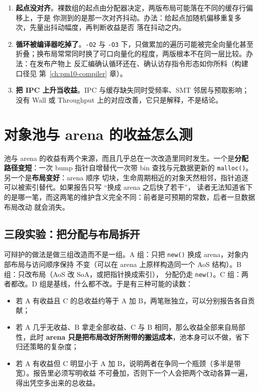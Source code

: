 \documentclass[12pt,a4paper,fontset=fandol]{ctexbook}
\newcommand{\Fn}[1]{\texttt{#1()}}
\newcommand{\Tp}[1]{\texttt{#1}}
\newcommand{\Lang}[1]{\textsf{#1}}
\newcommand{\MWall}{\Lang{Wall}}
\newcommand{\MThr}{\Lang{Throughput}}
\newcommand{\Mx}[1]{\textsf{#1}}
\begin{document}
\begin{warning}[title={局部性实验最常见的三个假信号}]
  \begin{enumerate}
    \item \textbf{起点没对齐}。裸数组的起点由分配器决定，两版布局可能落在不同的缓存行偏移上，于是
          你测到的是那一次对齐抖动。办法：给起点加随机偏移重复多次，先量出抖动幅度，再判断收益是否
          落在抖动之内。
    \item \textbf{循环被编译器吃掉了}。\Tp{-O2} 与 \Tp{-O3} 下，只做累加的遍历可能被完全向量化甚至
          折叠；换布局常常同时换了可口向量化的程度，两版根本不在同一层比较。办法：在发布产物上
          反汇编确认循环还在、确认访存指令形态如你所料（构建口径见 第~\ref{ch:pm10-compiler} 章）。
    \item \textbf{把 \Mx{IPC} 上升当收益}。\Mx{IPC} 与缓存缺失同时受频率、SMT 邻居与预取影响；没有
          \MWall{} 或 \MThr{} 上的对应改善，它只是解释，不是结论。
  \end{enumerate}
\end{warning}

\section{对象池与 arena 的收益怎么测}
\label{sec:pm07-pool}

池与 arena 的收益有两个来源，而且几乎总在一次改造里同时发生。一个是\textbf{分配路径变短}：一次
bump 指针自增替代一次带 bin 查找与元数据更新的 \Fn{malloc}。另一个是\textbf{布局变好}：arena 顺序
切块，生命周期相近的对象天然相邻，指针追逐可以被索引替代。如果报告只写 ``换成 arena 之后快了若干''，
读者无法知道省下的是哪一笔，而这两笔的维护含义完全不同：前者是可预期的常数，后者一旦数据布局改动
就会消失。

\subsection{三段实验：把分配与布局拆开}
\label{sub:pm07-threeway}

可辩护的做法是做三组改造而不是一组。A 组：只把 \Fn{new} 换成 arena，对象内部布局与访问顺序保持
不变（可以在 arena 上原样构造同一个 AoS 结构）。B 组：只改布局（AoS 改 SoA，或把指针换成索引），
分配仍走 \Fn{new}。C 组：两者都改。D 组是基线，什么都不改。于是有三种可能的读数：

\begin{itemize}
  \item 若 A 有收益且 C 的总收益约等于 A 加 B，两笔账独立，可以分别报告各自贡献；
  \item 若 A 几乎无收益、B 拿走全部收益、C 与 B 相同，那么收益全部来自局部性，此时
        \textbf{arena 只是把布局改好所附带的搬运成本}，池本身可以不做，省下归还策略的复杂度；
  \item 若 A 有收益但 C 明显小于 A 加 B，说明两者在争同一个瓶颈（多半是带宽）。报告里必须写明收益
        不可叠加，否则下一个人会把两个改动各算一遍，得出凭空多出来的总收益。
\end{itemize}
\end{document}

